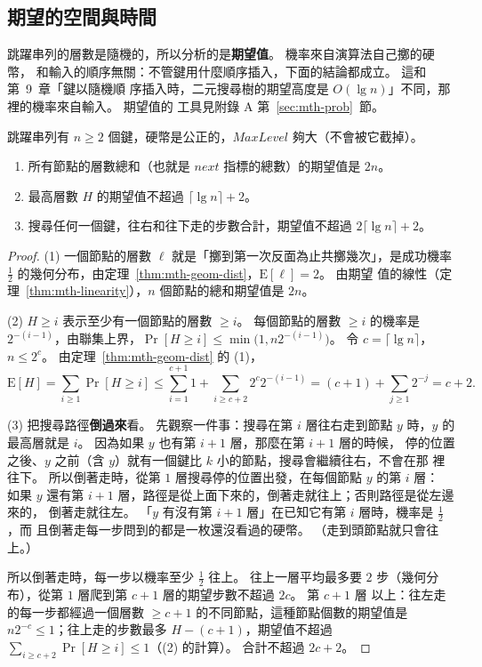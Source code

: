\subsection{期望的空間與時間}
\label{sec:bal-skip-analysis}

跳躍串列的層數是隨機的，所以分析的是\textbf{期望值}。 機率來自演算法自己擲的硬幣，
和輸入的順序無關：不管鍵用什麼順序插入，下面的結論都成立。 這和第~9~章「鍵以隨機順
序插入時，二元搜尋樹的期望高度是 $O(\lg n)$」不同，那裡的機率來自輸入。 期望值的
工具見附錄 A 第~\ref{sec:mth-prob}~節。

\begin{theorem}
\label{thm:bal-skip}
跳躍串列有 $n \ge 2$ 個鍵，硬幣是公正的，$\mathit{MaxLevel}$ 夠大（不會被它截掉）。
\begin{enumerate}
\item 所有節點的層數總和（也就是 $\mathit{next}$ 指標的總數）的期望值是 $2n$。
\item 最高層數 $H$ 的期望值不超過 $\lceil \lg n \rceil + 2$。
\item 搜尋任何一個鍵，往右和往下走的步數合計，期望值不超過
$2\lceil \lg n \rceil + 2$。
\end{enumerate}
\end{theorem}

\begin{proof}
(1) 一個節點的層數 $\ell$ 就是「擲到第一次反面為止共擲幾次」，是成功機率
$\frac12$ 的幾何分布，由定理~\ref{thm:mth-geom-dist}，$\mathrm{E}[\ell] = 2$。 由期望
值的線性（定理~\ref{thm:mth-linearity}），$n$ 個節點的總和期望值是 $2n$。

(2) $H \ge i$ 表示至少有一個節點的層數 $\ge i$。 每個節點的層數 $\ge i$ 的機率是
$2^{-(i-1)}$，由聯集上界，$\Pr[H \ge i] \le \min\bigl(1, n 2^{-(i-1)}\bigr)$。 令
$c = \lceil \lg n \rceil$，$n \le 2^c$。 由定理~\ref{thm:mth-geom-dist} 的 (1)，
\[
\mathrm{E}[H] = \sum_{i \ge 1} \Pr[H \ge i]
\le \sum_{i=1}^{c+1} 1 + \sum_{i \ge c+2} 2^{c} 2^{-(i-1)}
= (c + 1) + \sum_{j \ge 1} 2^{-j} = c + 2 .
\]

(3) 把搜尋路徑\textbf{倒過來}看。 先觀察一件事：搜尋在第 $i$ 層往右走到節點 $y$
時，$y$ 的最高層就是 $i$。 因為如果 $y$ 也有第 $i+1$ 層，那麼在第 $i + 1$ 層的時候，
停的位置之後、$y$ 之前（含 $y$）就有一個鍵比 $k$ 小的節點，搜尋會繼續往右，不會在那
裡往下。 所以倒著走時，從第 $1$ 層搜尋停的位置出發，在每個節點 $y$ 的第 $i$ 層：
如果 $y$ 還有第 $i + 1$ 層，路徑是從上面下來的，倒著走就往上；否則路徑是從左邊來的，
倒著走就往左。 「$y$ 有沒有第 $i+1$ 層」在已知它有第 $i$ 層時，機率是 $\frac12$，而
且倒著走每一步問到的都是一枚還沒看過的硬幣。 （走到頭節點就只會往上。）

所以倒著走時，每一步以機率至少 $\frac12$ 往上。 往上一層平均最多要
$2$ 步（幾何分布），從第 $1$ 層爬到第 $c + 1$ 層的期望步數不超過 $2c$。 第 $c+1$ 層
以上：往左走的每一步都經過一個層數 $\ge c + 1$ 的不同節點，這種節點個數的期望值是
$n 2^{-c} \le 1$；往上走的步數最多 $H - (c + 1)$，期望值不超過
$\sum_{i \ge c+2} \Pr[H \ge i] \le 1$（(2) 的計算）。 合計不超過 $2c + 2$。
\end{proof}

